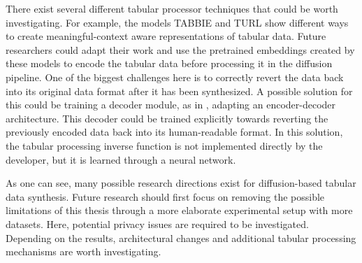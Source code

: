 There exist several different tabular processor techniques that could be worth investigating.
For example, the models TABBIE \cite{iida2021TABBIEPretrainedRepresentations} and TURL \cite{deng2021TURLTableUnderstanding} show different ways to create
meaningful-context aware representations of tabular data.
Future researchers could adapt their work and use the pretrained embeddings created by these models to encode the tabular data before processing it in the diffusion pipeline.
One of the biggest challenges here is to correctly revert the data back into its original data format after it has been synthesized.
A possible solution for this could be training a decoder module, as in \cite{rombach2022HighResolutionImageSynthesis}, adapting an encoder-decoder architecture.
This decoder could be trained explicitly towards reverting the previously encoded data back into its human-readable format.
In this solution, the tabular processing inverse function is not implemented directly by the developer, but it is learned through a neural network.

As one can see, many possible research directions exist for diffusion-based tabular data synthesis.
Future research should first focus on removing the possible limitations of this thesis through a more elaborate experimental setup with more datasets.
Here, potential privacy issues are required to be investigated.
Depending on the results, architectural changes and additional tabular processing mechanisms are worth investigating.